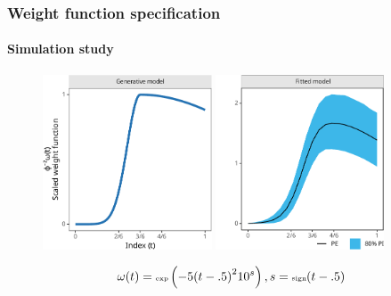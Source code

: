 \documentclass{snedecorbeamer}
\begin{document}
\begin{frame}
  \frametitle{Weight function specification}
  \framesubtitle{Simulation study}
  \begin{figure}
    \centering
    \includegraphics[height=14em]{inc/sim_truth_ase_fsc070.pdf}
    \includegraphics[height=14em]{inc/sim_posterior_ase_fsc070.pdf}
  \end{figure}
  \begin{equation}
    \tiny
    \omega(t)
    =\text{exp}\left(-5 {(t - .5)}^2 10^s\right), s = \text{sign}(t - .5)
  \end{equation}

\end{frame}
\end{document}
